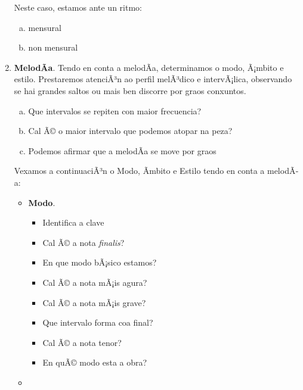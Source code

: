 \begin{multicols}{2}
\begin{enumerate}[1.-]
        Neste caso, estamos ante un ritmo:
        \begin{enumerate}[a)]
            \item mensural 
            \item non mensural 
        \end{enumerate}
        \item %
        \textbf{MelodÃ­a}. Tendo en conta a melodÃ­a, determinamos o modo, Ã¡mbito e estilo. Prestaremos atenciÃ³n ao perfil melÃ³dico e intervÃ¡lica, observando se hai grandes saltos ou mais ben discorre por graos conxuntos.
        \begin{enumerate}[a)]
            \item 
            Que intervalos se repiten con maior frecuencia? \dotfill
            \item 
            Cal Ã© o maior intervalo que podemos atopar na peza? \dotfill
            \item
            Podemos afirmar que a melodÃ­a se move por graos \dotfill
        \end{enumerate}
        Vexamos a continuaciÃ³n o Modo, Ãmbito e Estilo tendo en conta a melodÃ­a:
        \begin{itemize}
            \item %
            \textbf{Modo}.
        \begin{itemize}            
            \item 
            Identifica a clave \dotfill
            \item 
            Cal Ã© a nota \textit{finalis}? \dotfill
            \item
            En que modo bÃ¡sico estamos? \dotfill
            \item
            Cal Ã© a nota mÃ¡is agura? \dotfill 
            \item
            Cal Ã© a nota mÃ¡is grave? \dotfill 
            \item
            Que intervalo forma coa final? \dotfill
            \item
            Cal Ã© a nota tenor? \dotfill 
            \item
            En quÃ© modo esta a obra? \dotfill
       \end{itemize}
            \item %

\end{itemize}
\end{enumerate}
\end{multicols}
